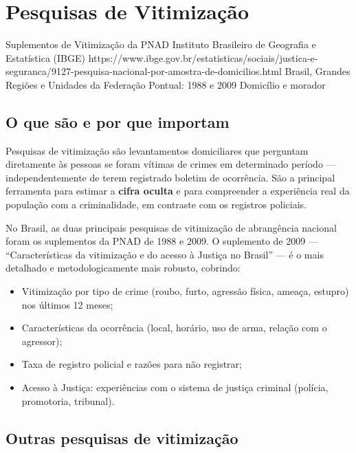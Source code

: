 \section{Pesquisas de Vitimização}

\ficharapida
  {Suplementos de Vitimização da PNAD}
  {Instituto Brasileiro de Geografia e Estatística (IBGE)}
  {https://www.ibge.gov.br/estatisticas/sociais/justica-e-seguranca/9127-pesquisa-nacional-por-amostra-de-domicilios.html}
  {Brasil, Grandes Regiões e Unidades da Federação}
  {Pontual: 1988 e 2009}
  {Domicílio e morador}

\subsection{O que são e por que importam}

Pesquisas de vitimização são levantamentos domiciliares que perguntam diretamente às pessoas se foram vítimas de crimes em determinado período --- independentemente de terem registrado boletim de ocorrência. São a principal ferramenta para estimar a \textbf{cifra oculta} e para compreender a experiência real da população com a criminalidade, em contraste com os registros policiais.

No Brasil, as duas principais pesquisas de vitimização de abrangência nacional foram os suplementos da PNAD de 1988 e 2009. O suplemento de 2009 --- ``Características da vitimização e do acesso à Justiça no Brasil'' --- é o mais detalhado e metodologicamente mais robusto, cobrindo:

\begin{itemize}
  \item Vitimização por tipo de crime (roubo, furto, agressão física, ameaça, estupro) nos últimos 12 meses;
  \item Características da ocorrência (local, horário, uso de arma, relação com o agressor);
  \item Taxa de registro policial e razões para não registrar;
  \item Acesso à Justiça: experiências com o sistema de justiça criminal (polícia, promotoria, tribunal).
\end{itemize}

\subsection{Outras pesquisas de vitimização}

